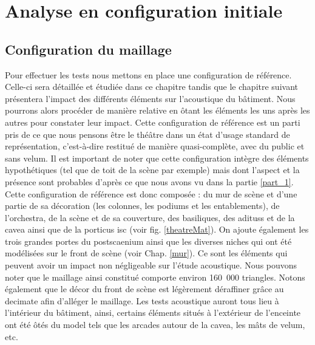 	
\chapter{Analyse en configuration initiale}
	\minitoc
	\newpage
	

	\section{Configuration du maillage}
Pour effectuer les tests nous mettons en place une configuration de référence. Celle-ci sera détaillée et étudiée dans ce chapitre tandis que le chapitre suivant présentera l'impact des différents éléments sur l'acoustique du bâtiment. Nous pourrons alors procéder de manière relative en ôtant les éléments les uns après les autres pour constater leur impact. Cette configuration de référence est un parti pris de ce que nous pensons être le théâtre dans un état d'usage standard de représentation, c'est-à-dire restitué de manière quasi-complète, avec du public et sans \gls{velum}. Il est important de noter que cette configuration intègre des éléments hypothétiques (tel que de toit de la scène par exemple) mais dont l'aspect et la présence sont probables d'après ce que nous avons vu dans la partie \ref{part_1}. Cette configuration de référence est donc composée : du mur de scène et d'une partie de sa décoration (les colonnes, les \glspl{podium} et les entablements), de l'\gls{orchestra}, de la scène et de sa couverture, des basiliques, des \glspl{aditus} et de la \gls{cavea} ainsi que de la \gls{porticus isc} (voir fig. \ref{theatreMat}). On ajoute également les trois grandes portes du \gls{postscaenium} ainsi que les diverses niches qui ont été modélisées sur le front de scène (voir Chap. \ref{mur}). Ce sont les éléments qui peuvent avoir un impact non négligeable sur l'étude acoustique. Nous pouvons noter que le maillage ainsi constitué comporte environ 160~000 triangles. Notons également que le décor du front de scène est légèrement déraffiner grâce au \gls{decimate} afin d'alléger le maillage. Les tests acoustique auront tous lieu à l'intérieur du bâtiment, ainsi, certains éléments situés à l'extérieur de l'enceinte ont été ôtés du model tels que les arcades autour de la \gls{cavea}, les mâts de \gls{velum}, etc. 

